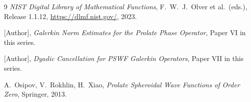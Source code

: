 \documentclass[12pt]{amsart}
\theoremstyle{definition}
\theoremstyle{remark}
\begin{document}
\begin{thebibliography}{9}
{\em NIST Digital Library of Mathematical Functions},
F.~W.~J.~Olver et al.\ (eds.),
Release 1.1.12, \url{https://dlmf.nist.gov/}, 2023.

[Author], \textit{Galerkin Norm Estimates for the Prolate
Phase Operator}, Paper VI in this series.

[Author], \textit{Dyadic Cancellation for PSWF Galerkin
Operators}, Paper VII in this series.

A.~Osipov, V.~Rokhlin, H.~Xiao,
\textit{Prolate Spheroidal Wave Functions of Order Zero},
Springer, 2013.
\end{thebibliography}
\end{document}
